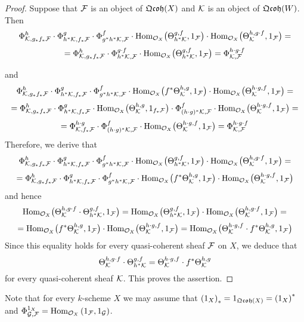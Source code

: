 \begin{proof}
Suppose that ${\mathcal F}$ is an object of $\mathfrak{Qcoh}(X)$ and ${\mathcal K}$ is an object of $\mathfrak{Qcoh}(W)$. Then
$$\Phi^h_{{\mathcal K},g_*f_*{\mathcal F}}\cdot \Phi^g_{h^*{\mathcal K},f_*{\mathcal F}}\cdot \Phi^f_{g^*h^*{\mathcal K},{\mathcal F}} \cdot \mathrm{Hom}_{{\mathcal O}_X}\big(\Theta^{g,f}_{h^*{\mathcal K}},1_{{\mathcal F}}\big) \cdot \mathrm{Hom}_{{\mathcal O}_X}\big(\Theta^{h,g\cdot f}_{{\mathcal K}},1_{{\mathcal F}}\big)  = $$
$$= \Phi^h_{{\mathcal K},g_*f_*{\mathcal F}}\cdot \Phi^{g\cdot f}_{h^*{\mathcal K},{\mathcal F}} \cdot \mathrm{Hom}_{{\mathcal O}_X}\big(\Theta^{g,f}_{h^*{\mathcal K}},1_{{\mathcal F}}\big) = \Phi^{h\cdot g\cdot f}_{{\mathcal K},{\mathcal F}}$$

and
$$\Phi^h_{{\mathcal K},g_*f_*{\mathcal F}}\cdot \Phi^g_{h^*{\mathcal K},f_*{\mathcal F}}\cdot \Phi^f_{g^*h^*{\mathcal K},{\mathcal F}}\cdot \mathrm{Hom}_{{\mathcal O}_X}\big(f^*\Theta^{h,g}_{{\mathcal K}},1_{{\mathcal F}}\big)\cdot \mathrm{Hom}_{{\mathcal O}_X}\big(\Theta^{h\cdot g,f}_{{\mathcal K}},1_{{\mathcal F}}\big) = $$
$$ = \Phi^h_{{\mathcal K},g_*f_*{\mathcal F}}\cdot \Phi^g_{h^*{\mathcal K},f_*{\mathcal F}}\cdot \mathrm{Hom}_{{\mathcal O}_X}\big(\Theta^{h,g}_{{\mathcal K}},1_{f_*{\mathcal F}}\big) \cdot  \Phi^f_{(h\cdot g)^*{\mathcal K},{\mathcal F}} \cdot \mathrm{Hom}_{{\mathcal O}_X}\big(\Theta^{h\cdot g,f}_{{\mathcal K}},1_{{\mathcal F}}\big) = $$
$$ = \Phi^{h\cdot g}_{{\mathcal K},f_*{\mathcal F}} \cdot  \Phi^f_{(h\cdot g)^*{\mathcal K},{\mathcal F}} \cdot \mathrm{Hom}_{{\mathcal O}_X}\big(\Theta^{h\cdot g,f}_{{\mathcal K}},1_{{\mathcal F}}\big) = \Phi^{h\cdot g\cdot f}_{{\mathcal K},{\mathcal F}} $$
Therefore, we derive that
$$\Phi^h_{{\mathcal K},g_*f_*{\mathcal F}}\cdot \Phi^g_{h^*{\mathcal K},f_*{\mathcal F}}\cdot \Phi^f_{g^*h^*{\mathcal K},{\mathcal F}}\cdot \mathrm{Hom}_{{\mathcal O}_X}\big(\Theta^{g,f}_{h^*{\mathcal K}},1_{{\mathcal F}}\big)\cdot \mathrm{Hom}_{{\mathcal O}_X}\big(\Theta^{h,g\cdot f}_{{\mathcal K}},1_{{\mathcal F}}\big) = $$
$$ = \Phi^h_{{\mathcal K},g_*f_*{\mathcal F}}\cdot \Phi^g_{h^*{\mathcal K},f_*{\mathcal F}}\cdot \Phi^f_{g^*h^*{\mathcal K},{\mathcal F}}\cdot \mathrm{Hom}_{{\mathcal O}_X}\big(f^*\Theta^{h,g}_{{\mathcal K}},1_{{\mathcal F}}\big)\cdot \mathrm{Hom}_{{\mathcal O}_X}\big(\Theta^{h\cdot g,f}_{{\mathcal K}},1_{{\mathcal F}}\big)$$
and hence
$$\mathrm{Hom}_{{\mathcal O}_X}\big(\Theta^{h,g\cdot f}_{{\mathcal K}} \cdot \Theta^{g,f}_{h^*{\mathcal K}},1_{{\mathcal F}}\big) = \mathrm{Hom}_{{\mathcal O}_X}\big(\Theta^{g,f}_{h^*{\mathcal K}},1_{{\mathcal F}}\big)\cdot \mathrm{Hom}_{{\mathcal O}_X}\big(\Theta^{h,g\cdot f}_{{\mathcal K}},1_{{\mathcal F}}\big) =$$
$$= \mathrm{Hom}_{{\mathcal O}_X}\big(f^*\Theta^{h,g}_{{\mathcal K}},1_{{\mathcal F}}\big) \cdot \mathrm{Hom}_{{\mathcal O}_X}\big(\Theta^{h\cdot g,f}_{{\mathcal K}},1_{{\mathcal F}}\big) = \mathrm{Hom}_{{\mathcal O}_X}\big( \Theta^{h\cdot g,f}_{{\mathcal K}} \cdot f^*\Theta^{h,g}_{{\mathcal K}},1_{{\mathcal F}}\big)$$
Since this equality holds for every quasi-coherent sheaf ${\mathcal F}$ on $X$, we deduce that
$$\Theta^{h,g\cdot f}_{{\mathcal K}} \cdot \Theta^{g,f}_{h^*{\mathcal K}} = \Theta^{h\cdot g,f}_{{\mathcal K}} \cdot f^*\Theta^{h,g}_{{\mathcal K}}$$
for every quasi-coherent sheaf ${\mathcal K}$. This proves the assertion.
\end{proof}
\noindent
Note that for every $k$-scheme $X$ we may assume that $\left(1_X\right)_* = 1_{\mathfrak{Qcoh}(X)} = \left(1_X\right)^*$ and $\Phi^{1_X}_{{\mathcal G},{\mathcal F}} = \mathrm{Hom}_{{\mathcal O}_X}\left(1_{\mathcal F},1_{\mathcal G}\right)$.

